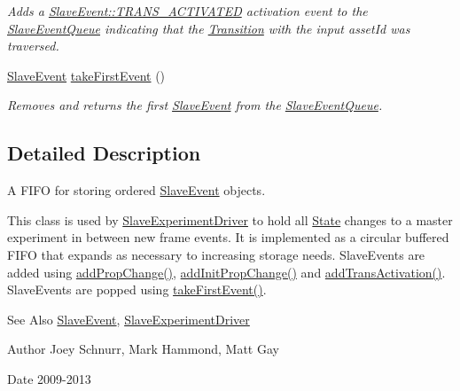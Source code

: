\begin{DoxyCompactItemize}
\begin{DoxyCompactList}\small\item\em Adds a \hyperlink{class_picto_1_1_slave_event_a5e2557edef42f1cfd7ae98463166c4a4add958a7663c6ffb3d2ab4cfacf30d82b}{Slave\-Event\-::\-T\-R\-A\-N\-S\-\_\-\-A\-C\-T\-I\-V\-A\-T\-E\-D} activation event to the \hyperlink{class_picto_1_1_slave_event_queue}{Slave\-Event\-Queue} indicating that the \hyperlink{class_picto_1_1_transition}{Transition} with the input asset\-Id was traversed. \end{DoxyCompactList}\item 
\hypertarget{class_picto_1_1_slave_event_queue_aef57823f47a577d8bb8291815f4ef86b}{\hyperlink{class_picto_1_1_slave_event}{Slave\-Event} \hyperlink{class_picto_1_1_slave_event_queue_aef57823f47a577d8bb8291815f4ef86b}{take\-First\-Event} ()}\label{class_picto_1_1_slave_event_queue_aef57823f47a577d8bb8291815f4ef86b}

\begin{DoxyCompactList}\small\item\em Removes and returns the first \hyperlink{class_picto_1_1_slave_event}{Slave\-Event} from the \hyperlink{class_picto_1_1_slave_event_queue}{Slave\-Event\-Queue}. \end{DoxyCompactList}\end{DoxyCompactItemize}


\subsection{Detailed Description}
A F\-I\-F\-O for storing ordered \hyperlink{class_picto_1_1_slave_event}{Slave\-Event} objects. 

This class is used by \hyperlink{class_picto_1_1_slave_experiment_driver}{Slave\-Experiment\-Driver} to hold all \hyperlink{class_picto_1_1_state}{State} changes to a master experiment in between new frame events. It is implemented as a circular buffered F\-I\-F\-O that expands as necessary to increasing storage needs. Slave\-Events are added using \hyperlink{class_picto_1_1_slave_event_queue_a99158db26e2d137b3d3fc4c2d9593538}{add\-Prop\-Change()}, \hyperlink{class_picto_1_1_slave_event_queue_a7ed77020ce552990cdf84f8f41283949}{add\-Init\-Prop\-Change()} and \hyperlink{class_picto_1_1_slave_event_queue_a1196dac6d07baefc65c52167aa3e93f6}{add\-Trans\-Activation()}. Slave\-Events are popped using \hyperlink{class_picto_1_1_slave_event_queue_aef57823f47a577d8bb8291815f4ef86b}{take\-First\-Event()}. \begin{DoxySeeAlso}{See Also}
\hyperlink{class_picto_1_1_slave_event}{Slave\-Event}, \hyperlink{class_picto_1_1_slave_experiment_driver}{Slave\-Experiment\-Driver} 
\end{DoxySeeAlso}
\begin{DoxyAuthor}{Author}
Joey Schnurr, Mark Hammond, Matt Gay 
\end{DoxyAuthor}
\begin{DoxyDate}{Date}
2009-\/2013 
\end{DoxyDate}


